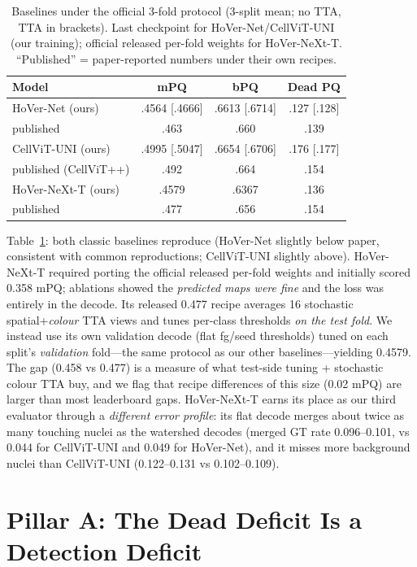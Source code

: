 \documentclass[11pt]{article}
\begin{document}
\begin{table}[t]
\centering\small
\caption{Baselines under the official 3-fold protocol (3-split mean; no TTA, TTA in brackets).
Last checkpoint for HoVer-Net/CellViT-UNI (our training); official released per-fold weights for
HoVer-NeXt-T. ``Published'' = paper-reported numbers under their own recipes.}
\label{tab:baselines}
\begin{tabular}{lccc}
\toprule
Model & mPQ & bPQ & Dead PQ \\
\midrule
HoVer-Net (ours)            & .4564 [.4666] & .6613 [.6714] & .127 [.128] \\
\quad published             & .463 & .660 & .139 \\
CellViT-UNI (ours)          & .4995 [.5047] & .6654 [.6706] & .176 [.177] \\
\quad published (CellViT++) & .492 & .664 & .154 \\
HoVer-NeXt-T (ours)         & .4579 & .6367 & .136 \\
\quad published             & .477 & .656 & .154 \\
\bottomrule
\end{tabular}
\end{table}

Table~\ref{tab:baselines}: both classic baselines reproduce (HoVer-Net slightly below paper,
consistent with common reproductions; CellViT-UNI slightly above). HoVer-NeXt-T required
porting the official released per-fold weights and initially scored 0.358 mPQ; ablations showed the \emph{predicted maps were fine}
and the loss was entirely in the decode. Its released 0.477 recipe averages 16 stochastic
spatial+\emph{colour} TTA views and tunes per-class thresholds \emph{on the test fold}. We
instead use its own validation decode (flat fg/seed thresholds) tuned on each split's
\emph{validation} fold---the same protocol as our other baselines---yielding 0.4579. The gap
(0.458 vs 0.477) is a measure of what test-side tuning + stochastic colour TTA buy, and we flag
that recipe differences of this size (0.02 mPQ) are larger than most leaderboard gaps.
HoVer-NeXt-T earns its place as our third evaluator through a \emph{different error profile}:
its flat decode merges about twice as many touching nuclei as the watershed decodes (merged GT
rate 0.096--0.101, vs 0.044 for CellViT-UNI and 0.049 for HoVer-Net), and it misses more
background nuclei than CellViT-UNI (0.122--0.131 vs 0.102--0.109).

\section{Pillar A: The Dead Deficit Is a Detection Deficit}
\label{sec:pillarA}
\end{document}
